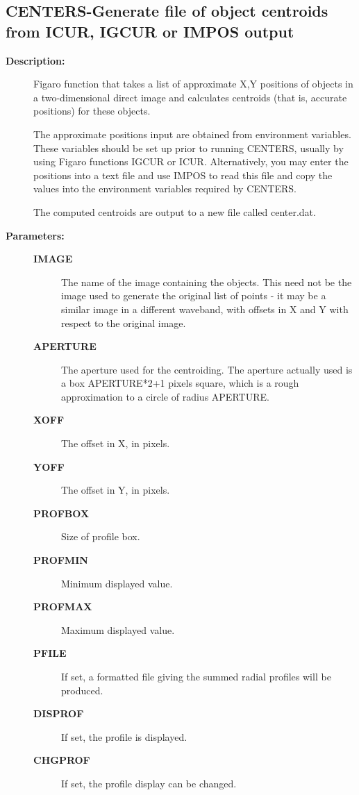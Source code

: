 \subsection{CENTERS-\label{CENTERS}Generate file of object centroids from ICUR, IGCUR or IMPOS output}
\begin{description}

\item [{\bf Description:}]
 Figaro function that takes a list of approximate X,Y positions
 of objects in a two-dimensional direct image and calculates
 centroids (that is, accurate positions) for these objects.

 The approximate positions input are obtained from environment
 variables.  These variables should be set up prior to running
 CENTERS, usually by using Figaro functions IGCUR or ICUR.
 Alternatively, you may enter the positions into a text file and use
 IMPOS to read this file and copy the values into the environment
 variables required by CENTERS.

 The computed centroids are output to a new file called center.dat.

\item [{\bf Parameters:}]
\begin{description}
\item [{\bf IMAGE}]
 The name of the image containing the objects.  This need not be the
 image used to generate the original list of points - it may be a
 similar image in a different waveband, with offsets in X and Y with
 respect to the original image.
\item [{\bf APERTURE}]
 The aperture used for the centroiding.  The aperture actually used is
 a box APERTURE*2+1 pixels square, which is a rough approximation to a
 circle of radius APERTURE.
\item [{\bf XOFF}]
 The offset in X, in pixels.
\item [{\bf YOFF}]
 The offset in Y, in pixels.
\item [{\bf PROFBOX}]
 Size of profile box.
\item [{\bf PROFMIN}]
 Minimum displayed value.
\item [{\bf PROFMAX}]
 Maximum displayed value.
\item [{\bf PFILE}]
 If set, a formatted file giving the summed radial profiles will
 be produced.
\item [{\bf DISPROF}]
 If set, the profile is displayed.
\item [{\bf CHGPROF}]
 If set, the profile display can be changed.
\end{description}


\end{description}
